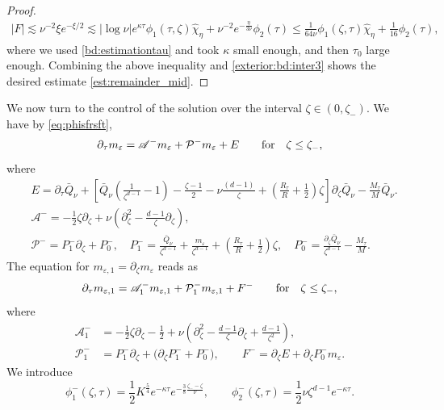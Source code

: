 \documentclass[11pt]{aims}
\theoremstyle{definition}
\newcommand{\ep}{\varepsilon}
\newcommand{\Pc}{\mathcal{P}}
\newcommand{\As}{\mathscr{A}}
\newcommand{\pa}{\partial}
\numberwithin{equation}{section}
\begin{document}
\begin{proof}
\begin{align*}
|F|\lesssim  \nu^{-2}\xi e^{-\xi/2}\lesssim  |\log \nu| e^{\kappa \tau}\phi_1(\tau,\zeta)\hat \chi_\eta+\nu^{-2}e^{-\frac{\eta}{3\nu}}\phi_2(\tau)\leq  \frac{1}{64\nu}\phi_1(\zeta, \tau) \hat \chi_{\eta} + \frac{1}{16}\phi_2(\tau),
\end{align*}
where we used \eqref{bd:estimationtau} and took $\kappa$ small enough, and then $\tau_0$ large enough. Combining the above inequality and \eqref{exterior:bd:inter3} shows the desired estimate \eqref{est:remainder_mid}.
\end{proof}


We now turn to the control of the solution over the interval $\zeta \in (0, \zeta_-)$. We have by \eqref{eq:phisfrsft},
\begin{equation}\label{eq:mepleft}
\pa_\tau m_\ep = \As^- m_\ep + \Pc^- m_\ep + E \qquad \textup{for}\quad  \zeta \leq \zeta_-,
\end{equation}  
where
\begin{align}
& E= \pa_\tau \bar Q_\nu + \left[  \bar Q_\nu \left(\frac{1}{\zeta^{d-1}} -1\right)  - \frac{\zeta - 1}{2}  -\nu\frac{(d-1)}{\zeta}  +  \left(\frac{R_\tau}{R} + \frac{1}{2} \right) \zeta \right] \pa_\zeta \bar Q_\nu  - \frac{M_\tau}{M} \bar Q_\nu.\label{def:Eerrorleft}\\
& \As^- = - \frac{1}{2}\zeta  \pa_\zeta   + \nu \left(\pa_\zeta^2-\frac{d-1}{\zeta}\pa_\zeta\right), \label{def:AsPcleft}\\
& \Pc^- = P_{1}^- \pa_\zeta + P_{0}^-, \quad P_{1}^- = \frac{ \bar Q_\nu }{\zeta^{d-1}}  + \frac{m_\ep}{\zeta^{d-1}} + \left(\frac{R_\tau}{R} + \frac{1}{2} \right) \zeta, \quad P_{0}^-= \frac{\pa_\zeta \bar Q_\nu}{\zeta^{d-1}} - \frac{M_\tau}{M}. \label{def:P1P0left}
\end{align}
The equation for $m_{\ep, 1} = \pa_\zeta m_\ep$ reads as
\begin{equation}\label{eq:mep1left}
\pa_\tau m_{\ep,1}= \As_1^- m_{\ep, 1} + \Pc_1^- m_{\ep,1} + F^- \qquad \textup{for}\quad  \zeta \leq \zeta_-,
\end{equation}
where
\begin{align}
\label{exterior:def:A1left} \As_1^-  &= -\frac{1}{2}\zeta \pa_\zeta - \frac{1}{2} +\nu \left(\pa_\zeta^2-\frac{d-1}{\zeta}\pa_\zeta + \frac{d-1}{\zeta^2}\right), \\
\label{exterior:def:P1left} \Pc_1^-  &= P_1^- \pa_\zeta + \big(\pa_\zeta P_{1}^- + P_0^-\big), \qquad F^- = \pa_\zeta E +\pa_\zeta P_0^- m_\ep.
\end{align}
We introduce
\begin{equation} \label{exterior:def:phi1phi2left}
\phi_1^-(\zeta, \tau) = \frac{1}{2} K^\frac{5}{4} e^{-\kappa \tau} e^{- \frac 38  \frac{\zeta_--\zeta}{\nu}  }, \qquad \phi_2^-(\zeta,\tau) = \frac{1}{2} \nu \zeta^{d-1} e^{-\kappa \tau}.
\end{equation}
\end{document}
